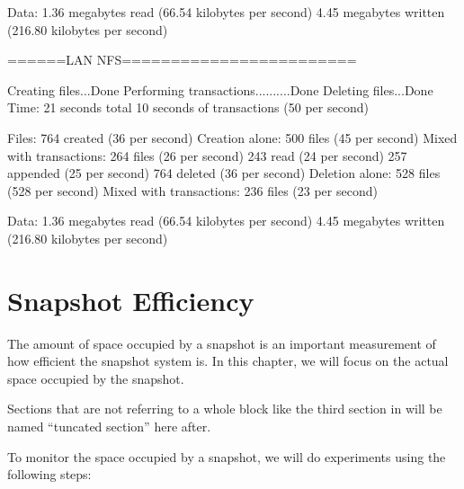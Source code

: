 Data:
	1.36 megabytes read (66.54 kilobytes per second)
	4.45 megabytes written (216.80 kilobytes per second)


======LAN NFS========================

Creating files...Done
Performing transactions..........Done
Deleting files...Done
Time:
	21 seconds total
	10 seconds of transactions (50 per second)

Files:
	764 created (36 per second)
		Creation alone: 500 files (45 per second)
		Mixed with transactions: 264 files (26 per second)
	243 read (24 per second)
	257 appended (25 per second)
	764 deleted (36 per second)
		Deletion alone: 528 files (528 per second)
		Mixed with transactions: 236 files (23 per second)

Data:
	1.36 megabytes read (66.54 kilobytes per second)
	4.45 megabytes written (216.80 kilobytes per second)


\section {Snapshot Efficiency}

    The amount of space occupied by a snapshot is an important measurement of how efficient the snapshot system is. In this chapter, we will focus on the actual space occupied by the snapshot.
    
    Sections that are not referring to a whole block like the third section in  will be named ``tuncated section'' here after.

    To monitor the space occupied by a snapshot, we will do experiments using the following steps:

